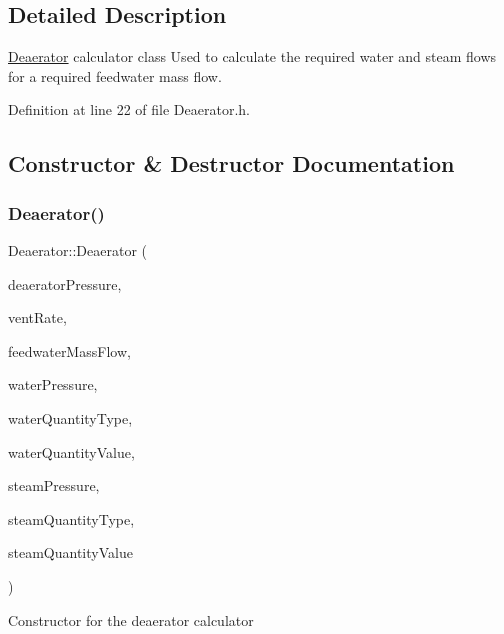 \subsection{Detailed Description}
\hyperlink{class_deaerator}{Deaerator} calculator class Used to calculate the required water and steam flows for a required feedwater mass flow. 

Definition at line 22 of file Deaerator.\+h.



\subsection{Constructor \& Destructor Documentation}
\mbox{\label{class_deaerator_a02311c34cbe46384187292e5f844984c}} 
\subsubsection{\texorpdfstring{Deaerator()}{Deaerator()}}
{\footnotesize\ttfamily Deaerator\+::\+Deaerator (\begin{DoxyParamCaption}\item[{double}]{deaerator\+Pressure,  }\item[{double}]{vent\+Rate,  }\item[{double}]{feedwater\+Mass\+Flow,  }\item[{double}]{water\+Pressure,  }\item[{\hyperlink{class_steam_properties_ae0294bedf7d178c2d8fb6aed0f62fbff}{Steam\+Properties\+::\+Thermodynamic\+Quantity}}]{water\+Quantity\+Type,  }\item[{double}]{water\+Quantity\+Value,  }\item[{double}]{steam\+Pressure,  }\item[{\hyperlink{class_steam_properties_ae0294bedf7d178c2d8fb6aed0f62fbff}{Steam\+Properties\+::\+Thermodynamic\+Quantity}}]{steam\+Quantity\+Type,  }\item[{double}]{steam\+Quantity\+Value }\end{DoxyParamCaption})}

Constructor for the deaerator calculator


